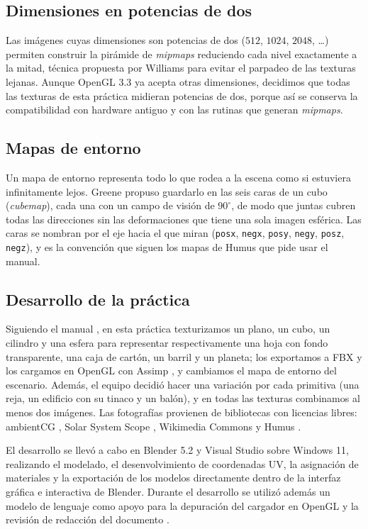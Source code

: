 \subsection*{Dimensiones en potencias de dos}
Las imágenes cuyas dimensiones son potencias de dos ($512$, $1024$, $2048$, \dots) permiten construir la pirámide de \textit{mipmaps} reduciendo cada nivel exactamente a la mitad, técnica propuesta por Williams \cite{williams1983} para evitar el parpadeo de las texturas lejanas. Aunque OpenGL 3.3 ya acepta otras dimensiones, decidimos que todas las texturas de esta práctica midieran potencias de dos, porque así se conserva la compatibilidad con hardware antiguo y con las rutinas que generan \textit{mipmaps}.

\subsection*{Mapas de entorno}
Un mapa de entorno representa todo lo que rodea a la escena como si estuviera infinitamente lejos. Greene \cite{greene1986} propuso guardarlo en las seis caras de un cubo (\textit{cubemap}), cada una con un campo de visión de $90^\circ$, de modo que juntas cubren todas las direcciones sin las deformaciones que tiene una sola imagen esférica. Las caras se nombran por el eje hacia el que miran (\texttt{posx}, \texttt{negx}, \texttt{posy}, \texttt{negy}, \texttt{posz}, \texttt{negz}), y es la convención que siguen los mapas de Humus \cite{humus} que pide usar el manual.

\subsection*{Desarrollo de la práctica}
Siguiendo el manual \cite{teodoro_vite}, en esta práctica texturizamos un plano, un cubo, un cilindro y una esfera para representar respectivamente una hoja con fondo transparente, una caja de cartón, un barril y un planeta; los exportamos a FBX y los cargamos en OpenGL con Assimp \cite{assimp}, y cambiamos el mapa de entorno del escenario. Además, el equipo decidió hacer una variación por cada primitiva (una reja, un edificio con su tinaco y un balón), y en todas las texturas combinamos al menos dos imágenes. Las fotografías provienen de bibliotecas con licencias libres: ambientCG \cite{ambientcg}, Solar System Scope \cite{solarsystemscope}, Wikimedia Commons \cite{hoja_commons, carton_commons} y Humus \cite{humus}.

El desarrollo se llevó a cabo en Blender 5.2 y Visual Studio sobre Windows 11, realizando el modelado, el desenvolvimiento de coordenadas UV, la asignación de materiales y la exportación de los modelos directamente dentro de la interfaz gráfica e interactiva de Blender. Durante el desarrollo se utilizó además un modelo de lenguaje como apoyo para la depuración del cargador en OpenGL y la revisión de redacción del documento \cite{anthropic2026}.
